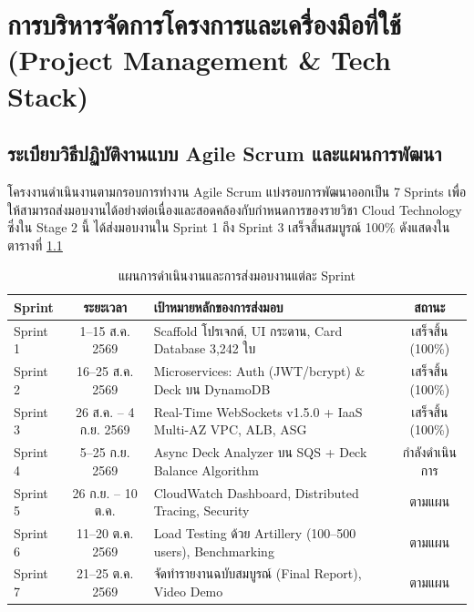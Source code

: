 \documentclass[12pt,a4paper]{report}
\begin{document}
\chapter{การบริหารจัดการโครงการและเครื่องมือที่ใช้ (Project Management \& Tech Stack)}

\section{ระเบียบวิธีปฏิบัติงานแบบ Agile Scrum และแผนการพัฒนา}
โครงงานดำเนินงานตามกรอบการทำงาน Agile Scrum แบ่งรอบการพัฒนาออกเป็น 7 Sprints เพื่อให้สามารถส่งมอบงานได้อย่างต่อเนื่องและสอดคล้องกับกำหนดการของรายวิชา Cloud Technology ซึ่งใน Stage 2 นี้ ได้ส่งมอบงานใน Sprint 1 ถึง Sprint 3 เสร็จสิ้นสมบูรณ์ 100\% ดังแสดงในตารางที่ \ref{tab:sprint_plan}

\begin{table}[H]
\centering
\caption{แผนการดำเนินงานและการส่งมอบงานแต่ละ Sprint}
\label{tab:sprint_plan}
\begin{tabularx}{\textwidth}{lcp{6.5cm}c}
\toprule
\textbf{Sprint} & \textbf{ระยะเวลา} & \textbf{เป้าหมายหลักของการส่งมอบ} & \textbf{สถานะ} \\
\midrule
Sprint 1 & 1--15 ส.ค. 2569 & Scaffold โปรเจกต์, UI กระดาน, Card Database 3,242 ใบ & เสร็จสิ้น (100\%) \\
Sprint 2 & 16--25 ส.ค. 2569 & Microservices: Auth (JWT/bcrypt) \& Deck บน DynamoDB & เสร็จสิ้น (100\%) \\
Sprint 3 & 26 ส.ค. -- 4 ก.ย. 2569 & Real-Time WebSockets v1.5.0 + IaaS Multi-AZ VPC, ALB, ASG & เสร็จสิ้น (100\%) \\
Sprint 4 & 5--25 ก.ย. 2569 & Async Deck Analyzer บน SQS + Deck Balance Algorithm & กำลังดำเนินการ \\
Sprint 5 & 26 ก.ย. -- 10 ต.ค. & CloudWatch Dashboard, Distributed Tracing, Security & ตามแผน \\
Sprint 6 & 11--20 ต.ค. 2569 & Load Testing ด้วย Artillery (100--500 users), Benchmarking & ตามแผน \\
Sprint 7 & 21--25 ต.ค. 2569 & จัดทำรายงานฉบับสมบูรณ์ (Final Report), Video Demo & ตามแผน \\
\bottomrule
\end{tabularx}
\end{table}
\end{document}
